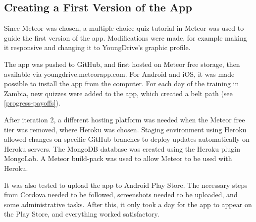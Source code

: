 
\subsection{Creating a First Version of the App}
Since Meteor was chosen, a multiple-choice quiz tutorial in Meteor was used to guide the first version of the app. Modifications were made, for example making it responsive and changing it to YoungDrive's graphic profile.

The app was pushed to GitHub, and first hosted on Meteor free storage, then available via youngdrive.meteorapp.com. For Android and iOS, it was made possible to install the app from the computer.  For each day of the training in Zambia, new quizzes were added to the app, which created a belt path (see \ref{progress-payoffs}).

After iteration 2, a different hosting platform was needed when the Meteor free tier was removed, where Heroku was chosen. Staging environment using Heroku allowed changes on specific GitHub branches to deploy updates automatically on Heroku servers. The MongoDB database was created using the Heroku plugin MongoLab. A Meteor build-pack was used to allow Meteor to be used with Heroku.

It was also tested to upload the app to Android Play Store. The necessary steps from Cordova needed to be followed, screenshots needed to be uploaded, and some administrative tasks. After this, it only took a day for the app to appear on the Play Store, and everything worked satisfactory.
